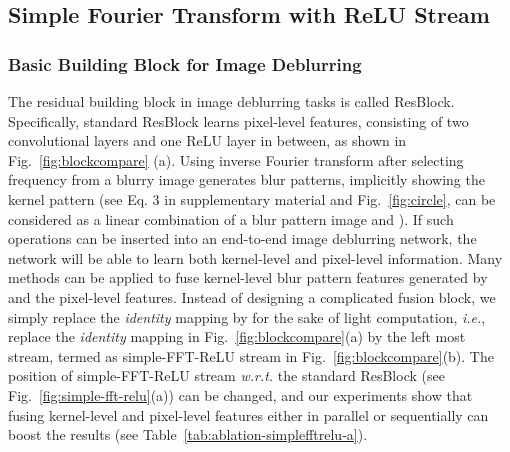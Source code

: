\documentclass[letterpaper]{article} \usepackage{aaai23}  \usepackage{times}  \usepackage{helvet}  \usepackage{courier}  \usepackage[hyphens]{url}  \usepackage{graphicx} \usepackage{enumitem}
\begin{document}
\subsection{Simple Fourier Transform with ReLU Stream}

\subsubsection{Basic Building Block for Image Deblurring}
The residual building block in image deblurring tasks is called ResBlock. Specifically, standard ResBlock learns pixel-level features, consisting of two  convolutional layers and one ReLU layer in between, as shown in Fig.~\ref{fig:blockcompare} (a). Using inverse Fourier transform after selecting frequency from a blurry image  generates blur patterns, implicitly showing the kernel pattern (see Eq. 3 in supplementary material and Fig.~\ref{fig:circle},  can be considered as a linear combination of a blur pattern image  and ). If such operations can be inserted into an end-to-end image deblurring network, the network will be able to learn both kernel-level and pixel-level information. Many methods can be applied to fuse kernel-level blur pattern features generated by  and the pixel-level features. Instead of designing a complicated fusion block, we simply replace the \textit{identity} mapping by  for the sake of light computation, \emph{i.e.}, replace the \textit{identity} mapping in Fig.~\ref{fig:blockcompare}(a) by the left most stream, termed as simple-FFT-ReLU stream in Fig.~\ref{fig:blockcompare}(b). The position of simple-FFT-ReLU stream \emph{w.r.t.} the standard ResBlock (see Fig.~\ref{fig:simple-fft-relu}(a)) can be changed, and our experiments show that fusing kernel-level and pixel-level features either in parallel or sequentially can boost the results (see Table~\ref{tab:ablation-simplefftrelu-a}). 
\end{document}
